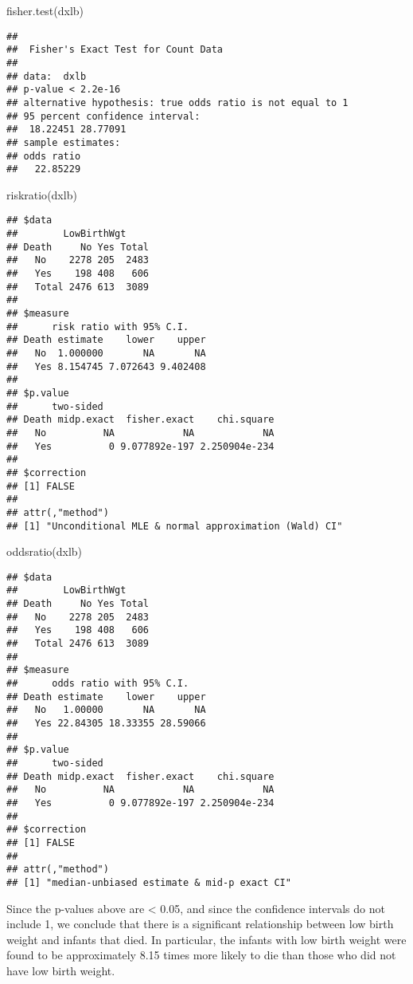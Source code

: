 \documentclass[
]{article}
\newenvironment{Shaded}{\begin{snugshade}}{\end{snugshade}}
\newcommand{\FunctionTok}[1]{\textcolor[rgb]{0.00,0.00,0.00}{#1}}
\newcommand{\NormalTok}[1]{#1}
\begin{document}
\begin{Shaded}
\begin{Highlighting}[]
\FunctionTok{fisher.test}\NormalTok{(dxlb)}
\end{Highlighting}
\end{Shaded}

\begin{verbatim}
## 
##  Fisher's Exact Test for Count Data
## 
## data:  dxlb
## p-value < 2.2e-16
## alternative hypothesis: true odds ratio is not equal to 1
## 95 percent confidence interval:
##  18.22451 28.77091
## sample estimates:
## odds ratio 
##   22.85229
\end{verbatim}

\begin{Shaded}
\begin{Highlighting}[]
\FunctionTok{riskratio}\NormalTok{(dxlb)}
\end{Highlighting}
\end{Shaded}

\begin{verbatim}
## $data
##        LowBirthWgt
## Death     No Yes Total
##   No    2278 205  2483
##   Yes    198 408   606
##   Total 2476 613  3089
## 
## $measure
##      risk ratio with 95% C.I.
## Death estimate    lower    upper
##   No  1.000000       NA       NA
##   Yes 8.154745 7.072643 9.402408
## 
## $p.value
##      two-sided
## Death midp.exact  fisher.exact    chi.square
##   No          NA            NA            NA
##   Yes          0 9.077892e-197 2.250904e-234
## 
## $correction
## [1] FALSE
## 
## attr(,"method")
## [1] "Unconditional MLE & normal approximation (Wald) CI"
\end{verbatim}

\begin{Shaded}
\begin{Highlighting}[]
\FunctionTok{oddsratio}\NormalTok{(dxlb)}
\end{Highlighting}
\end{Shaded}

\begin{verbatim}
## $data
##        LowBirthWgt
## Death     No Yes Total
##   No    2278 205  2483
##   Yes    198 408   606
##   Total 2476 613  3089
## 
## $measure
##      odds ratio with 95% C.I.
## Death estimate    lower    upper
##   No   1.00000       NA       NA
##   Yes 22.84305 18.33355 28.59066
## 
## $p.value
##      two-sided
## Death midp.exact  fisher.exact    chi.square
##   No          NA            NA            NA
##   Yes          0 9.077892e-197 2.250904e-234
## 
## $correction
## [1] FALSE
## 
## attr(,"method")
## [1] "median-unbiased estimate & mid-p exact CI"
\end{verbatim}

Since the p-values above are \textless{} 0.05, and since the confidence
intervals do not include 1, we conclude that there is a significant
relationship between low birth weight and infants that died. In
particular, the infants with low birth weight were found to be
approximately 8.15 times more likely to die than those who did not have
low birth weight.
\end{document}
